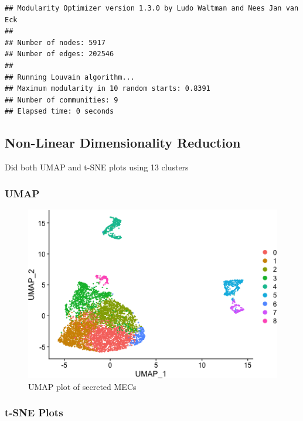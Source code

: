 \documentclass[]{article}
\begin{document}
\begin{verbatim}
## Modularity Optimizer version 1.3.0 by Ludo Waltman and Nees Jan van Eck
## 
## Number of nodes: 5917
## Number of edges: 202546
## 
## Running Louvain algorithm...
## Maximum modularity in 10 random starts: 0.8391
## Number of communities: 9
## Elapsed time: 0 seconds
\end{verbatim}

\hypertarget{non-linear-dimensionality-reduction}{%
\subsection{Non-Linear Dimensionality
Reduction}\label{non-linear-dimensionality-reduction}}

Did both UMAP and t-SNE plots using 13 clusters

\hypertarget{umap}{%
\subsubsection{UMAP}\label{umap}}

\begin{figure}
\centering
\includegraphics{figures/umap-plot-initial-1.png}
\caption{UMAP plot of secreted MECs}
\end{figure}

\hypertarget{t-sne-plots}{%
\subsubsection{t-SNE Plots}\label{t-sne-plots}}
\end{document}

